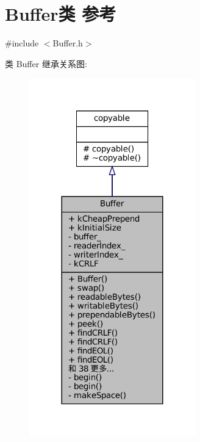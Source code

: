 \hypertarget{classmuduo_1_1net_1_1Buffer}{}\section{Buffer类 参考}
\label{classmuduo_1_1net_1_1Buffer}


{\ttfamily \#include $<$Buffer.\+h$>$}



类 Buffer 继承关系图\+:
\nopagebreak
\begin{figure}[H]
\begin{center}
\leavevmode
\includegraphics[width=204pt]{classmuduo_1_1net_1_1Buffer__inherit__graph}
\end{center}
\end{figure}


